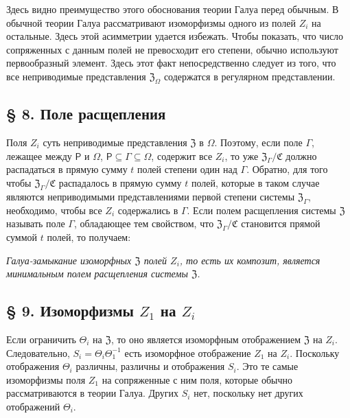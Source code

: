 \documentclass[11pt]{article}
\begin{document}
Здесь видно преимущество этого обоснования теории Галуа перед обычным. В обычной теории Галуа рассматривают изоморфизмы одного из полей \(Z_i\) на остальные. Здесь этой асимметрии удается избежать. Чтобы показать, что число сопряженных с данным полей не превосходит его степени, обычно используют первообразный элемент. Здесь этот факт непосредственно следует из того, что все неприводимые представления \(\mathfrak Z_\Omega\) содержатся в регулярном представлении.

\subsection*{§ 8. Поле расщепления}\label{der-zerfaellungskoerper}

Поля \(Z_i\) суть неприводимые представления \(\mathfrak Z\) в \(\Omega\). Поэтому, если поле \(\Gamma\), лежащее между \(\mathsf P\) и \(\Omega\), \(\mathsf P\subseteq\Gamma\subseteq\Omega\), содержит все \(Z_i\), то уже \(\mathfrak Z_\Gamma/\mathfrak C\) должно распадаться в прямую сумму \(t\) полей степени один над \(\Gamma\). Обратно, для того чтобы \(\mathfrak Z_\Gamma/\mathfrak C\) распадалось в прямую сумму \(t\) полей, которые в таком случае являются неприводимыми представлениями первой степени системы \(\mathfrak Z_\Gamma\), необходимо, чтобы все \(Z_i\) содержались в \(\Gamma\). Если полем расщепления системы \(\mathfrak Z\) называть поле \(\Gamma\), обладающее тем свойством, что \(\mathfrak Z_\Gamma/\mathfrak C\) становится прямой суммой \(t\) полей, то получаем:

\emph{Галуа-замыкание изоморфных \(\mathfrak Z\) полей \(Z_i\), то есть их композит, является минимальным полем расщепления системы \(\mathfrak Z\).}

\subsection*{§ 9. Изоморфизмы \(Z_1\) на \(Z_i\)}\label{die-isomorphismen-von-z1-auf-die-zi}

Если ограничить \(\Theta_i\) на \(\mathfrak Z\), то оно является изоморфным отображением \(\mathfrak Z\) на \(Z_i\). Следовательно, \(S_i=\Theta_i\Theta_1^{-1}\) есть изоморфное отображение \(Z_1\) на \(Z_i\). Поскольку отображения \(\Theta_i\) различны, различны и отображения \(S_i\). Это те самые изоморфизмы поля \(Z_1\) на сопряженные с ним поля, которые обычно рассматриваются в теории Галуа. Других \(S_i\) нет, поскольку нет других отображений \(\Theta_i\).
\end{document}
